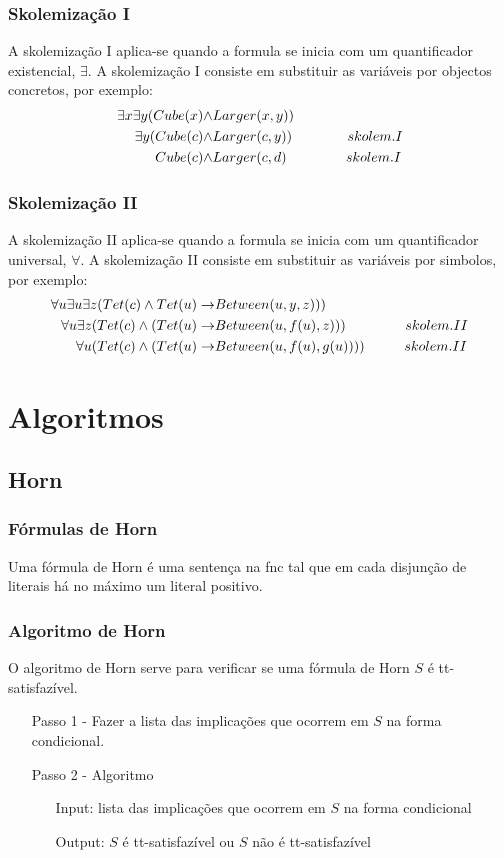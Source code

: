 \documentclass[10pt,a4paper]{report}
\begin{document}
\subsection{Skolemização I}
A skolemização I aplica-se quando a formula se inicia com um quantificador existencial, $\exists$. A skolemização
I consiste em substituir as variáveis por objectos concretos, por exemplo:
\begin{align}
\exists x \exists y(Cube(x) \land& Larger(x, y))\\
\exists y(Cube(c) \land& Larger(c, y)) \hspace{1.4cm} skolem. I\\
Cube(c) \land& Larger(c, d) \hspace{1.5cm} skolem.I
\end{align}
\subsection{Skolemização II}
A skolemização II aplica-se quando a formula se inicia com um quantificador universal, $\forall$. A skolemização II consiste em substituir as variáveis por simbolos, por exemplo:
\begin{align}
\forall u \exists u \exists z(Tet(c) \land Tet(u) \rightarrow& Between(u, y, z)))\\
\forall u \exists z(Tet(c) \land (Tet(u) \rightarrow& Between(u, f(u), z))) \hspace{1.5cm} skolem.II\\
\forall u(Tet(c) \land (Tet(u) \rightarrow& Between(u, f(u), g(u)))) \hspace{1cm} skolem.II
\end{align}

\chapter{Algoritmos}
\section{Horn}
\subsection{Fórmulas de Horn}
Uma fórmula de Horn é uma sentença na fnc tal que em cada disjunção
de literais há no máximo um literal positivo.
\subsection{Algoritmo de Horn}
O algoritmo de Horn serve para verificar se uma fórmula de Horn $S$ é tt-satisfazível.
\begin{itemize}
\item[Passo 1 -] Fazer a lista das implicações que ocorrem em $S$ na forma
condicional.
\item[Passo 2 -] Algoritmo \begin{itemize}
\item[Input:] lista das implicações que ocorrem em $S$ na forma condicional
\item[Output:] $S$ é tt-satisfazível ou $S$ não é tt-satisfazível
\end{itemize}
\end{itemize}
\end{document}
